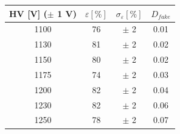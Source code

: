     \begin{tabular}{cccc}
    \toprule
    HV [V] ($\pm$ 1 V)& $\varepsilon [\%]$ & $\sigma_{\varepsilon} [\%]$ & $D_{fake}$ \\
    \midrule
    1100 & 76 & $\pm$ 2 & 0.01 \\
    1130 & 81 & $\pm$ 2 & 0.02 \\
    1150 & 80 & $\pm$ 2 & 0.02 \\
    1175 & 74 & $\pm$ 2 & 0.03 \\
    1200 & 82 & $\pm$ 2 & 0.04 \\
    1230 & 82 & $\pm$ 2 & 0.06 \\
    1250 & 78 & $\pm$ 2 & 0.07 \\
    \bottomrule
    \end{tabular}